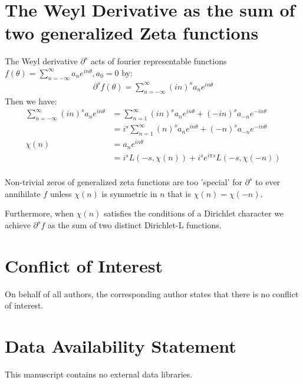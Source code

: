 \documentclass{artjltcopy}
\newcommand{\?}{\textbackslash}
\begin{document}
\section{The Weyl Derivative as the sum of two generalized Zeta functions}
The Weyl derivative $\partial^s$ \cite{article} acts of fourier representable functions 
$f(\theta)= \sum_{n=-\infty}^\infty a_n e^{i n \theta}, a_0 = 0$ by:
\begin{align*}
  \partial^s f(\theta)= \sum_{n=-\infty}^\infty (in)^s a_n e^{i n \theta}
\end{align*}
Then we have:
\begin{align*}
  \sum_{n=-\infty}^\infty (in)^s a_n e^{i n \theta} &= \sum_{n=1}^\infty (in)^s a_n e^{i n \theta} + (-in)^s a_{-n} e^{-i n \theta} \\
  &= i^s \sum_{n=1}^\infty (n)^s a_n e^{i n \theta} + (-n)^s a_{-n} e^{-i n \theta} \\
  \chi(n) &= a_n e^{i n \theta} \\
  &= i^s L(-s,\chi(n)) + i^s e^{i \pi s} L(-s,\chi(-n)) \\
\end{align*}
\begin{conjecture}
Non-trivial zeros of generalized zeta functions are too 'special' for $\partial^s$ to ever annihilate $f$ unless $\chi(n)$ is symmetric in $n$ that is $\chi(n) = \chi(-n)$. 
\end{conjecture}
Furthermore, when $\chi(n)$ satisfies the conditions of a Dirichlet character we achieve $\partial^s f$ as the sum of two distinct Dirichlet-L functions. \cite{davenport2000}
\section*{Conflict of Interest}
On behalf of all authors, the corresponding author states that there is no conflict of interest.
\section*{Data Availability Statement}
This manuscript contains no external data libraries.
\end{document}
